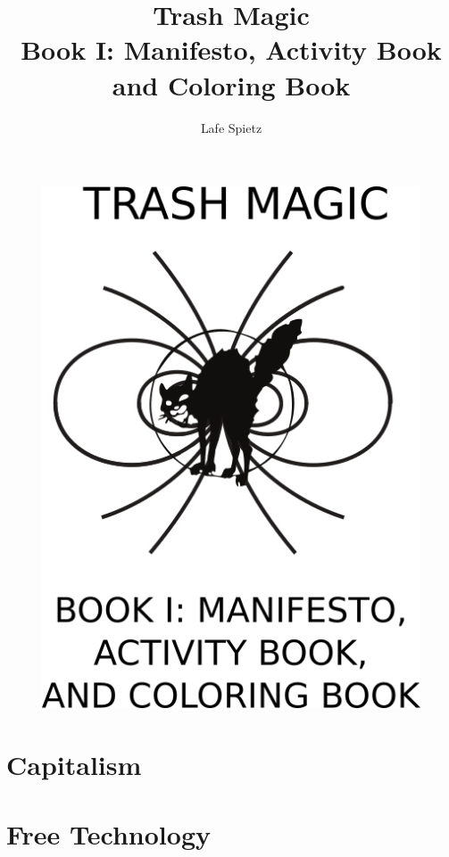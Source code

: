 \documentclass[ebook,12pt,openany,onesided]{memoir} %
\title{Trash Magic \\ Book I: Manifesto, Activity Book and Coloring Book}
\author{Lafe Spietz}
\begin{document}
\frontmatter
\begin{figure}[htbp]
\centering
\includegraphics{images/frontcover2.png}
\end{figure}

\clearpage

\clearpage



\newpage
\thispagestyle{empty}
\mbox{}



\maketitle

\tableofcontents

\listoffigures 

\mainmatter
\chapter{Capitalism}

\newpage


\chapter{Free Technology}

\newpage

\end{document}
